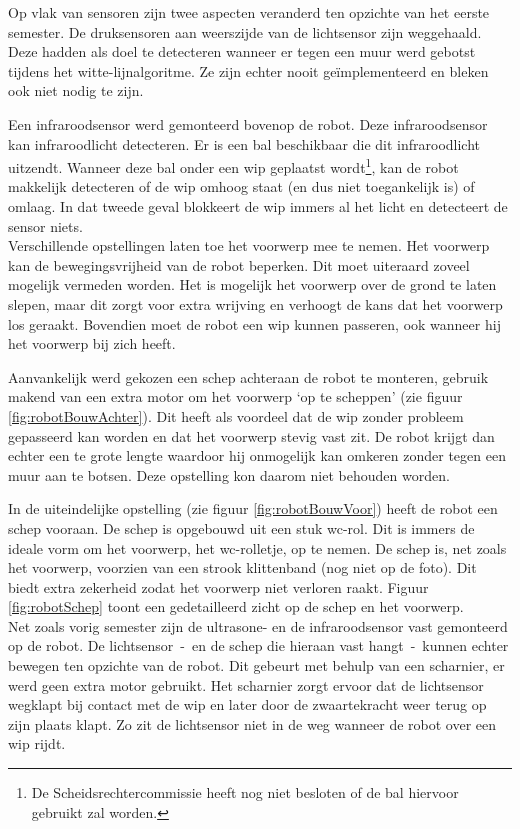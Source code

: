 \documentclass[tt1]{penoverslag}
\begin{document}
Op vlak van sensoren zijn twee aspecten veranderd ten opzichte van het eerste semester. De druksensoren aan weerszijde van de lichtsensor zijn weggehaald. Deze hadden als doel te detecteren wanneer er tegen een muur werd gebotst tijdens het witte-lijnalgoritme. Ze zijn echter nooit ge\"implementeerd en bleken ook niet nodig te zijn.

Een infraroodsensor werd gemonteerd bovenop de robot. Deze infraroodsensor kan infraroodlicht detecteren. Er is een bal beschikbaar die dit infraroodlicht uitzendt. Wanneer deze bal onder een wip geplaatst wordt\footnote{De Scheidsrechtercommissie heeft nog niet besloten of de bal hiervoor gebruikt zal worden.}, kan de robot makkelijk detecteren of de wip omhoog staat (en dus niet toegankelijk is) of omlaag. In dat tweede geval blokkeert de wip immers al het licht en detecteert de sensor niets.\\

Verschillende opstellingen laten toe het voorwerp mee te nemen. Het voorwerp kan de bewegingsvrijheid van de robot beperken. Dit moet uiteraard zoveel mogelijk vermeden worden. Het is mogelijk het voorwerp over de grond te laten slepen, maar dit zorgt voor extra wrijving en verhoogt de kans dat het voorwerp los geraakt. Bovendien moet de robot een wip kunnen passeren, ook wanneer hij het voorwerp bij zich heeft. 
 
Aanvankelijk werd gekozen een schep achteraan de robot te monteren, gebruik makend van een extra motor om het voorwerp `op te scheppen' (zie figuur \ref{fig:robotBouwAchter}). Dit heeft als voordeel dat de wip zonder probleem gepasseerd kan worden en dat het voorwerp stevig vast zit. De robot krijgt dan echter een te grote lengte waardoor hij onmogelijk kan omkeren zonder tegen een muur aan te botsen. Deze opstelling kon daarom niet behouden worden.

In de uiteindelijke opstelling (zie figuur \ref{fig:robotBouwVoor}) heeft de robot een schep vooraan. De schep is opgebouwd uit een stuk wc-rol. Dit is immers de ideale vorm om het voorwerp, het wc-rolletje, op te nemen. De schep is, net zoals het voorwerp, voorzien van een strook klittenband (nog niet op de foto). Dit biedt extra zekerheid zodat het voorwerp niet verloren raakt. Figuur \ref{fig:robotSchep} toont een gedetailleerd zicht op de schep en het voorwerp.\\

Net zoals vorig semester zijn de ultrasone- en de infraroodsensor vast gemonteerd op de robot. De lichtsensor~-~en de schep die hieraan vast hangt~-~kunnen echter bewegen ten opzichte van de robot. Dit gebeurt met behulp van een scharnier, er werd geen extra motor gebruikt. Het scharnier zorgt ervoor dat de lichtsensor wegklapt bij contact met de wip en later door de zwaartekracht weer terug op zijn plaats klapt. Zo zit de lichtsensor niet in de weg wanneer de robot over een wip rijdt.
\end{document}
